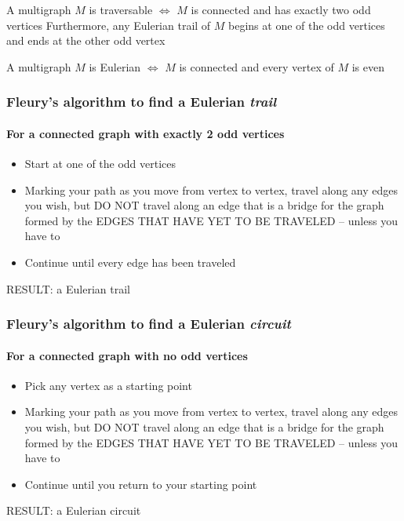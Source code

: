 \documentclass[aspectratio=169]{beamer}\usepackage[]{graphicx}\usepackage[]{xcolor}
\begin{document}
\begin{frame}
\begin{theorem}
	A multigraph $M$ is traversable $\iff$ $M$ is connected and has exactly two odd vertices
	\vskip0.2cm
	Furthermore, any Eulerian trail of $M$ begins at one of the odd vertices and ends at the other odd vertex
\end{theorem}
\vfill
\begin{theorem}
	A multigraph $M$ is Eulerian $\iff$ $M$ is connected and every vertex of $M$ is even
\end{theorem}
\end{frame}




\begin{frame}
	\frametitle{Fleury's algorithm to find a Eulerian \emph{trail}}
	\framesubtitle{For a connected graph with exactly 2 odd vertices}
\begin{itemize}
	\item Start at one of the odd vertices
	\item Marking your path as you move from vertex to vertex, travel along any edges you wish, but DO NOT travel along an edge that is a bridge for the graph formed by the EDGES THAT HAVE YET TO BE TRAVELED -- unless you have to
	\item Continue until every edge has been traveled
\end{itemize}
RESULT: a Eulerian trail
\end{frame}


\begin{frame}
	\frametitle{Fleury's algorithm to find a Eulerian \emph{circuit}}
	\framesubtitle{For a connected graph with no odd vertices}

	\begin{itemize}
	\item Pick any vertex as a starting point
	\item Marking your path as you move from vertex to vertex, travel along any edges you wish, but DO NOT travel along an edge that is a bridge for the graph formed by the EDGES THAT HAVE YET TO BE TRAVELED -- unless you have to
	\item Continue until you return to your starting point
\end{itemize}
RESULT: a Eulerian circuit
\end{frame}
\end{document}
